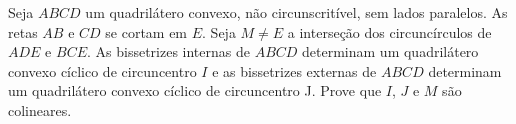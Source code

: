 Seja $ABCD$ um quadrilátero convexo, não circunscritível, sem lados paralelos. As retas $AB$ e $CD$ se cortam em $E$. Seja $M \neq E$ a interseção dos circuncírculos de $ADE$ e $BCE$. As bissetrizes internas de $ABCD$ determinam um quadrilátero convexo cíclico de circuncentro $I$ e as bissetrizes externas de $ABCD$ determinam um quadrilátero convexo cíclico de circuncentro J. Prove que $I$, $J$ e $M$ são colineares.

